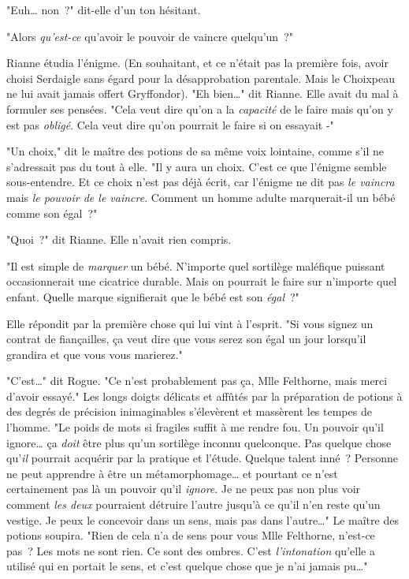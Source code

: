 "Euh… non~?" dit-elle d'un ton hésitant.

"Alors \emph{qu'est-ce} qu'avoir le pouvoir de vaincre quelqu'un~?"

Rianne étudia l'énigme. (En souhaitant, et ce n'était pas la première fois, avoir choisi Serdaigle sans égard pour la désapprobation parentale. Mais le Choixpeau ne lui avait jamais offert Gryffondor). "Eh bien…" dit Rianne. Elle avait du mal à formuler ses pensées. "Cela veut dire qu'on a la \emph{capacité} de le faire mais qu'on y est pas \emph{obligé}. Cela veut dire qu'on pourrait le faire si on essayait -"

"Un choix," dit le maître des potions de sa même voix lointaine, comme s'il ne s'adressait pas du tout à elle. "Il y aura un choix. C'est ce que l'énigme semble sous-entendre. Et ce choix n'est pas déjà écrit, car l'énigme ne dit pas \emph{le vaincra} mais \emph{le pouvoir de le vaincre}. Comment un homme adulte marquerait-il un bébé comme son égal~?"

"Quoi~?" dit Rianne. Elle n'avait rien compris.

"Il est simple de \emph{marquer} un bébé. N'importe quel sortilège maléfique puissant occasionnerait une cicatrice durable. Mais on pourrait le faire sur n'importe quel enfant. Quelle marque signifierait que le bébé est son \emph{égal}~?"

Elle répondit par la première chose qui lui vint à l'esprit. "Si vous signez un contrat de fiançailles, ça veut dire que vous serez son égal un jour lorsqu'il grandira et que vous vous marierez."

"C'est…" dit Rogue. "Ce n'est probablement pas ça, Mlle Felthorne, mais merci d'avoir essayé." Les longs doigts délicats et affûtés par la préparation de potions à des degrés de précision inimaginables s'élevèrent et massèrent les tempes de l'homme. "Le poids de mots si fragiles suffit à me rendre fou. Un pouvoir qu'il ignore… ça \emph{doit} être plus qu'un sortilège inconnu quelconque. Pas quelque chose qu'\emph{il} pourrait acquérir par la pratique et l'étude. Quelque talent inné~? Personne ne peut apprendre à être un métamorphomage… et pourtant ce n'est certainement pas là un pouvoir qu'il \emph{ignore}. Je ne peux pas non plus voir comment \emph{les deux} pourraient détruire l'autre jusqu'à ce qu'il n'en reste qu'un vestige. Je peux le concevoir dans un sens, mais pas dans l'autre…" Le maître des potions soupira. "Rien de cela n'a de sens pour vous Mlle Felthorne, n'est-ce pas~? Les mots ne sont rien. Ce sont des ombres. C'est \emph{l'intonation} qu'elle a utilisé qui en portait le sens, et c'est quelque chose que je n'ai jamais pu…"

